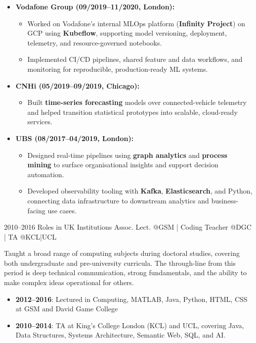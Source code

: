 \documentclass[]{../../friggeri-cv}
\begin{document}
\begin{entrylist}
{{        }
        \begin{itemize}[left=-1.5em]
            \item \footnotesize\textbf{Vodafone Group (09/2019–11/2020, London):}
                \begin{itemize}
                    \item \footnotesize Worked on Vodafone's internal MLOps platform (\textbf{Infinity Project}) on GCP using \textbf{Kubeflow}, supporting model versioning, deployment, telemetry, and resource-governed notebooks.
                    \item \footnotesize Implemented CI/CD pipelines, shared feature and data workflows, and monitoring for reproducible, production-ready ML systems.
                \end{itemize}
            \item \footnotesize\textbf{CNHi (05/2019–09/2019, Chicago):}
                \begin{itemize}
                    \item \footnotesize Built \textbf{time-series forecasting} models over connected-vehicle telemetry and helped transition statistical prototypes into scalable, cloud-ready services.
                \end{itemize}
            \item \footnotesize\textbf{UBS (08/2017–04/2019, London):}
                \begin{itemize}
                    \item \footnotesize Designed real-time pipelines using \textbf{graph analytics} and \textbf{process mining} to surface organisational insights and support decision automation.
                    \item \footnotesize Developed observability tooling with \textbf{Kafka}, \textbf{Elasticsearch}, and Python, connecting data infrastructure to downstream analytics and business-facing use cases.
                \end{itemize}
        \end{itemize}
    }
    \entry
    {\footnotesize 2010–2016}
    {Roles in UK Institutions}
    {\small Assoc. Lect. @GSM | Coding Teacher @DGC | TA @KCL|UCL}
    {
        {\small
        \setlength{\parindent}{-1.5em}
        \setlength{\leftskip}{-1.5em}
        Taught a broad range of computing subjects during doctoral studies, covering both undergraduate and pre-university curricula. The through-line from this period is deep technical communication, strong fundamentals, and the ability to make complex ideas operational for others.

        }
        \begin{itemize}[left=-1.5em]
            \item {\footnotesize \textbf{2012–2016}: Lectured in Computing, MATLAB, Java, Python, HTML, CSS at GSM and David Game College}
            \item {\footnotesize \textbf{2010–2014}: TA at King’s College London (KCL) and UCL, covering Java, Data Structures, Systems Architecture, Semantic Web, SQL, and AI.}
        \end{itemize}
    }
\end{entrylist}
\end{document}
